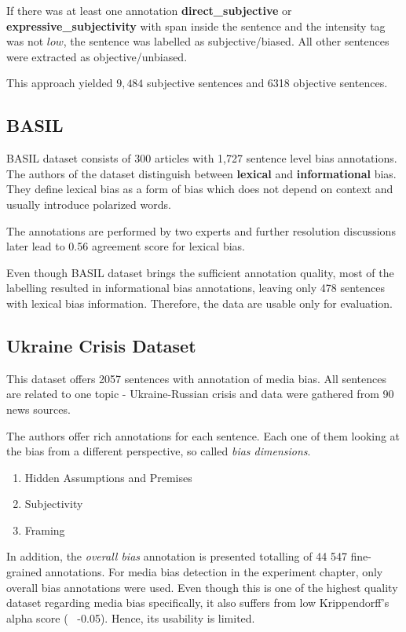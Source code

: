 If there was at least one annotation \textbf{direct\_subjective} or \textbf{expressive\_subjectivity} with span inside the sentence and the intensity tag was not $low$, the sentence was labelled as subjective/biased. All other sentences were extracted as objective/unbiased.

This approach yielded $9,484$ subjective sentences and 6318 objective sentences.




\subsection{BASIL}
BASIL dataset \cite{fan2019plain} consists of 300 articles with 1,727 sentence level bias annotations. The authors of the dataset distinguish between \textbf{lexical} and \textbf{informational} bias. They define lexical bias as a form of bias which does not depend on context and usually introduce polarized words.

The annotations are performed by two experts and further resolution discussions later lead to 0.56 agreement score for lexical bias.

Even though BASIL dataset brings the sufficient annotation quality, most of the labelling resulted in informational bias annotations, leaving only 478 sentences with lexical bias information. Therefore, the data are usable only for evaluation.




\subsection{Ukraine Crisis Dataset}
This dataset \cite{farber2020multidimensional} offers 2057 sentences with annotation of media bias. All sentences are related to one topic - Ukraine-Russian crisis and data were gathered from 90 news sources.

The authors offer rich annotations for each sentence. Each one of them looking at the bias from a different perspective, so called \textit{bias dimensions}.
\begin{enumerate}
    \item Hidden Assumptions and Premises
    \item Subjectivity
    \item Framing
\end{enumerate}
In addition, the \textit{overall bias} annotation is presented totalling of 44 547 fine-grained annotations. For media bias detection in the experiment chapter, only overall bias annotations were used.
Even though this is one of the highest quality dataset regarding media bias specifically, it also suffers from low Krippendorff’s alpha score (~ -0.05). Hence, its usability is limited. 




